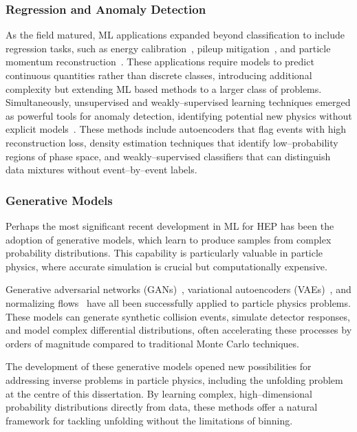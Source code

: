 \subsubsection{Regression and Anomaly Detection}
        \label{subsubsec:regression-and-anomaly-detection}
As the field matured, ML applications expanded beyond classification to include regression tasks, such as energy calibration~\cite{Holmberg2023JetPipeline}, pileup mitigation~\cite{Komiske2018PileupPUMML}, and particle momentum reconstruction~\cite{Haake2019Machine-learning-basedCollisions}.
%
These applications require models to predict continuous quantities rather than discrete classes, introducing additional complexity but extending ML based methods to a larger class of problems.
%
Simultaneously, unsupervised and weakly--supervised learning techniques emerged as powerful tools for anomaly detection, identifying potential new physics without explicit models~\cite{Belis2024MachinePhysics}.
%
These methods include autoencoders that flag events with high reconstruction loss, density estimation techniques that identify low--probability regions of phase space, and weakly--supervised classifiers that can distinguish data mixtures without event--by--event labels.

\subsubsection{Generative Models}
Perhaps the most significant recent development in ML for HEP has been the adoption of generative models, which learn to produce samples from complex probability distributions.
%
This capability is particularly valuable in particle physics, where accurate simulation is crucial but computationally expensive.

Generative adversarial networks (GANs)~\cite{Goodfellow2014GenerativeNetworks}, variational autoencoders (VAEs)~\cite{Kingma2019AnAutoencoders}, and normalizing flows~\cite{Kobyzev2019NormalizingMethods} have all been successfully applied to particle physics problems.
%
These models can generate synthetic collision events\cite{Moodie2022OptimisingNetworks}, simulate detector responses\cite{Darulis2022MachineSimulations, Xu2023GenerativeFlow}, and model complex differential distributions,\cite{Butter2025GenerativeMapping} often accelerating these processes by orders of magnitude compared to traditional Monte Carlo techniques.

The development of these generative models opened new possibilities for addressing inverse problems in particle physics, including the unfolding problem at the centre of this dissertation.
%
By learning complex, high--dimensional probability distributions directly from data, these methods offer a natural framework for tackling unfolding without the limitations of binning.


